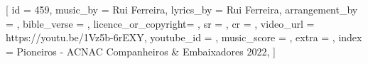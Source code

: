 [
    id                  = {459},
    music_by            = {Rui Ferreira}, %
    lyrics_by           = {Rui Ferreira}, %
    arrangement_by      = {}, %
    bible_verse         = {},
    licence_or_copyright= {},
    sr                  = {},
    cr                  = {},
    video_url           = {https://youtu.be/1Vz5b-6rEXY}, %
    youtube_id          = {}, %
    music_score         = {}, %
    extra               = {},
    index               = {Pioneiros - ACNAC Companheiros & Embaixadores 2022},
]

